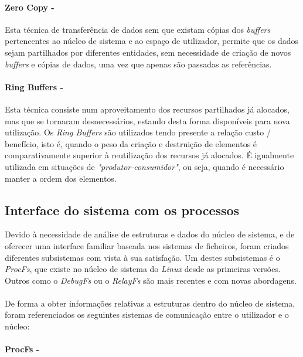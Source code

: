 \paragraph*{Zero Copy - }

Esta técnica de transferência de dados sem que existam cópias dos \textit{buffers} pertencentes ao núcleo de sistema e ao espaço de utilizador, permite que os dados sejam partilhados por diferentes entidades, sem necessidade de criação de novos \textit{buffers} e cópias de dados, uma vez que apenas são passadas as referências.

\paragraph*{Ring Buffers - }

Esta técnica consiste num aproveitamento dos recursos partilhados já alocados, mas que se tornaram desnecessários, estando desta forma disponíveis para nova utilização.
Os \textit{Ring Buffers} são utilizados tendo presente a relação custo / benefício, isto é, quando o peso da criação e destruição de elementos é comparativamente superior à reutilização dos recursos já alocados.
É igualmente utilizada em situações de \textit{"produtor-consumidor"}, ou seja, quando é necessário manter a ordem dos elementos.


\subsection{Interface do sistema com os processos}

Devido à necessidade de análise de estruturas e dados do núcleo de sistema, e de oferecer uma interface familiar baseada nos sistemas de ficheiros, foram criados diferentes subsistemas com vista à sua satisfação.
Um destes subsistemas é o \textit{ProcFs}, que existe no núcleo de sistema do \textit{Linux} desde as primeiras versões.
Outros como o \textit{DebugFs} ou o \textit{RelayFs} são mais recentes e com novas abordagens.

\paragraph*{}
De forma a obter informações relativas a estruturas dentro do núcleo de sistema, foram referenciados os seguintes sistemas de comunicação entre o utilizador e o núcleo:

\paragraph*{ProcFs - }\label{cap:ProcFs_overview}

